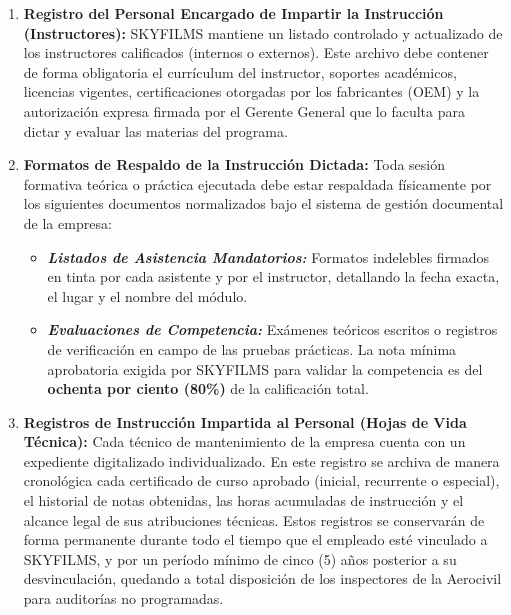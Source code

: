 \begin{enumerate}
    \item \textbf{Registro del Personal Encargado de Impartir la Instrucción (Instructores):}
    SKYFILMS mantiene un listado controlado y actualizado de los instructores calificados (internos o externos). Este archivo debe contener de forma obligatoria el currículum del instructor, soportes académicos, licencias vigentes, certificaciones otorgadas por los fabricantes (OEM) y la autorización expresa firmada por el Gerente General que lo faculta para dictar y evaluar las materias del programa.
    
    \item \textbf{Formatos de Respaldo de la Instrucción Dictada:}
    Toda sesión formativa teórica o práctica ejecutada debe estar respaldada físicamente por los siguientes documentos normalizados bajo el sistema de gestión documental de la empresa:
    \begin{itemize}
        \item \textit{\textbf{Listados de Asistencia Mandatorios:}} Formatos indelebles firmados en tinta por cada asistente y por el instructor, detallando la fecha exacta, el lugar y el nombre del módulo.
        \item \textit{\textbf{Evaluaciones de Competencia:}} Exámenes teóricos escritos o registros de verificación en campo de las pruebas prácticas. La nota mínima aprobatoria exigida por SKYFILMS para validar la competencia es del \textbf{ochenta por ciento (80\%)} de la calificación total.
    \end{itemize}
    
    \item \textbf{Registros de Instrucción Impartida al Personal (Hojas de Vida Técnica):}
    Cada técnico de mantenimiento de la empresa cuenta con un expediente digitalizado individualizado. En este registro se archiva de manera cronológica cada certificado de curso aprobado (inicial, recurrente o especial), el historial de notas obtenidas, las horas acumuladas de instrucción y el alcance legal de sus atribuciones técnicas. Estos registros se conservarán de forma permanente durante todo el tiempo que el empleado esté vinculado a SKYFILMS, y por un período mínimo de cinco (5) años posterior a su desvinculación, quedando a total disposición de los inspectores de la Aerocivil para auditorías no programadas.
\end{enumerate}

